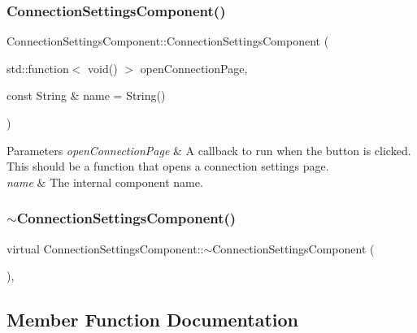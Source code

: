 \subsubsection{\texorpdfstring{Connection\+Settings\+Component()}{ConnectionSettingsComponent()}}
{\footnotesize\ttfamily Connection\+Settings\+Component\+::\+Connection\+Settings\+Component (\begin{DoxyParamCaption}\item[{std\+::function$<$ void() $>$}]{open\+Connection\+Page,  }\item[{const String \&}]{name = {\ttfamily String()} }\end{DoxyParamCaption})}


\begin{DoxyParams}{Parameters}
{\em open\+Connection\+Page} & A callback to run when the button is clicked. This should be a function that opens a connection settings page.\\
\hline
{\em name} & The internal component name. \\
\hline
\end{DoxyParams}
\mbox{\label{classConnectionSettingsComponent_a52003605df73cdfaeb28b4d3395cbf28}} 
\subsubsection{\texorpdfstring{$\sim$\+Connection\+Settings\+Component()}{~ConnectionSettingsComponent()}}
{\footnotesize\ttfamily virtual Connection\+Settings\+Component\+::$\sim$\+Connection\+Settings\+Component (\begin{DoxyParamCaption}{ }\end{DoxyParamCaption})\hspace{0.3cm}{\ttfamily [inline]}, {\ttfamily [virtual]}}



\subsection{Member Function Documentation}
\mbox{\label{classConnectionSettingsComponent_aef6ce832a9a3301f38049ce8c7811df9}} 
